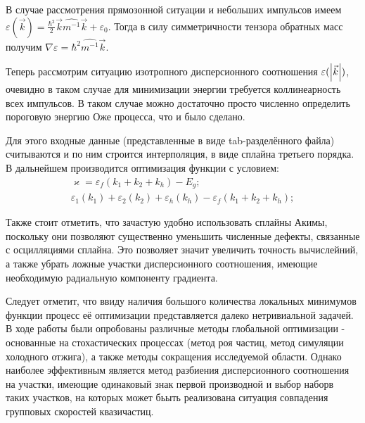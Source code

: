         В случае рассмотрения
                прямозонной ситуации и небольших импульсов имеем 
                    $\varepsilon (\vec k) = \frac{\hbar^2}{2} \vec k \widehat{m^{-1}} \vec k + \varepsilon_0$.
                Тогда в силу симметричности тензора обратных масс получим $\nabla \varepsilon = \hbar^2 \widehat{m^{-1}} \vec k$.

        Теперь рассмотрим ситуацию изотропного дисперсионного соотношения $\varepsilon(\abs{\vec k})$,
        очевидно в таком случае для минимизации энергии требуется коллинеарность всех импульсов. 
        В таком случае можно достаточно просто численно определить пороговую энергию Оже процесса, что и было сделано.

        Для этого входные данные (представленные в виде tab-разделённого файла) считываются и по ним строится интерполяция,
        в виде сплайна третьего порядка. В дальнейшем производится оптимизация функции с условием:
        \begin{eqnarray}
            \varkappa  = \varepsilon_f(k_1 + k_2 + k_h) - E_g;\\
            \varepsilon_1(k_1) + \varepsilon_2(k_2) + \varepsilon_h(k_h) - \varepsilon_f(k_1 + k_2 + k_h);
        \end{eqnarray}

        Также стоит отметить, что зачастую удобно использовать сплайны Акимы, поскольку они позволяют существенно уменьшить
        численные дефекты, связанные с осцилляциями сплайна. Это позволяет значит увеличить точность вычислейний, а также убрать ложные
        участки дисперсионного соотношения, имеющие необходимую радиальную компоненту градиента.

        Следует отметит, что ввиду наличия большого количества локальных минимумов функции процесс её оптимизации представляется далеко нетривиальной задачей.
        В ходе работы были опробованы различные методы глобальной оптимизации - основанные на стохастических процессах (метод роя частиц, метод 
        симуляции холодного отжига), а также методы  сокращения исследуемой области. Однако наиболее эффективным является метод разбиения 
        дисперсионного соотношения на участки, имеющие одинаковый знак первой производной и выбор наборв таких участков,
        на которых может бьыть реализована ситуация совпадения групповых скоростей квазичастиц.

